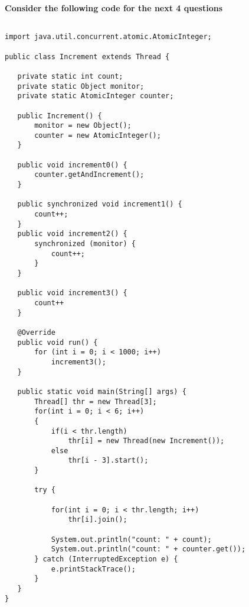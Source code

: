 \documentclass[S17-Final.tex]{subfiles}
\begin{document}
\begin{enumerate}




\clearpage
\textbf{Consider the following code for the next 4 questions}

\begin{lstlisting}

import java.util.concurrent.atomic.AtomicInteger;
  
public class Increment extends Thread {
  
   private static int count;
   private static Object monitor;
   private static AtomicInteger counter;
  
   public Increment() {
       monitor = new Object();
       counter = new AtomicInteger();
   }
  
   public void increment0() {
       counter.getAndIncrement();
   }
  
   public synchronized void increment1() {
       count++;
   }
   public void increment2() {
       synchronized (monitor) {
           count++;
       }
   }
  
   public void increment3() {
       count++
   }
  
   @Override
   public void run() {
       for (int i = 0; i < 1000; i++)
           increment3();
   }
  
   public static void main(String[] args) {
       Thread[] thr = new Thread[3];
       for(int i = 0; i < 6; i++)
       {
           if(i < thr.length)
               thr[i] = new Thread(new Increment());
           else
               thr[i - 3].start();
       }
  
       try {
  
           for(int i = 0; i < thr.length; i++)
               thr[i].join();
  
           System.out.println("count: " + count);
           System.out.println("count: " + counter.get());
       } catch (InterruptedException e) {
           e.printStackTrace();
       }
   }
}
\end{lstlisting}


\end{enumerate}
\end{document}
